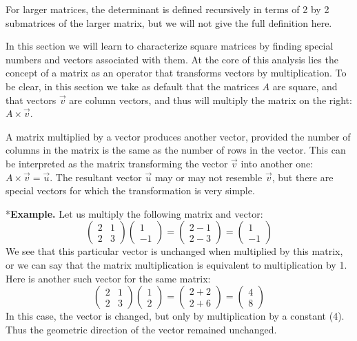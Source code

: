 \documentclass[
  letterpaper,
  DIV=11,
  numbers=noendperiod]{scrreprt}
\begin{document}
For larger matrices, the determinant is defined recursively in terms of
2 by 2 submatrices of the larger matrix, but we will not give the full
definition here.

In this section we will learn to characterize square matrices by finding
special numbers and vectors associated with them. At the core of this
analysis lies the concept of a matrix as an operator that transforms
vectors by multiplication. To be clear, in this section we take as
default that the matrices \(A\) are square, and that vectors \(\vec v\)
are column vectors, and thus will multiply the matrix on the right:
\(A \times \vec v\).

A matrix multiplied by a vector produces another vector, provided the
number of columns in the matrix is the same as the number of rows in the
vector. This can be interpreted as the matrix transforming the vector
\(\vec v\) into another one: \(A \times \vec v = \vec u\). The resultant
vector \(\vec u\) may or may not resemble \(\vec v\), but there are
special vectors for which the transformation is very simple.

*\textbf{Example.} Let us multiply the following matrix and vector: \[ 
\left(\begin{array}{cc}2 & 1 \\ 2& 3\end{array}\right)\left(\begin{array}{c}1 \\ -1 \end{array}\right) = \left(\begin{array}{c}2 -1 \\ 2 - 3 \end{array}\right) =  \left(\begin{array}{c} 1 \\ -1 \end{array}\right) 
\] We see that this particular vector is unchanged when multiplied by
this matrix, or we can say that the matrix multiplication is equivalent
to multiplication by 1. Here is another such vector for the same matrix:
\[ 
 \left(\begin{array}{cc}2 & 1 \\ 2& 3\end{array}\right)\left(\begin{array}{c}1 \\ 2 \end{array}\right) = \left(\begin{array}{c}2 +2 \\ 2 + 6 \end{array}\right) =  \left(\begin{array}{c} 4 \\ 8 \end{array}\right) 
\] In this case, the vector is changed, but only by multiplication by a
constant (4). Thus the geometric direction of the vector remained
unchanged.
\end{document}
